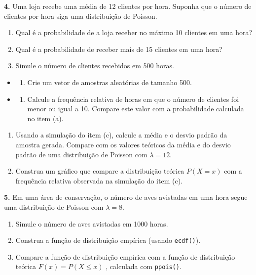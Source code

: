 \documentclass[
]{book}
\providecommand{\tightlist}{%
  \setlength{\itemsep}{0pt}\setlength{\parskip}{0pt}}
\begin{document}
\textbf{4.} Uma loja recebe uma média de 12 clientes por hora. Suponha que o número de clientes por hora siga uma distribuição de Poisson.

\begin{enumerate}
\def\labelenumi{(\alph{enumi})}
\item
  Qual é a probabilidade de a loja receber no máximo 10 clientes em uma hora?
\item
  Qual é a probabilidade de receber mais de 15 clientes em uma hora?
\item
  Simule o número de clientes recebidos em 500 horas.
\end{enumerate}

\begin{itemize}
\tightlist
\item
  \begin{enumerate}
  \def\labelenumi{(\roman{enumi})}
  \tightlist
  \item
    Crie um vetor de amostras aleatórias de tamanho 500.
  \end{enumerate}
\item
  \begin{enumerate}
  \def\labelenumi{(\roman{enumi})}
  \setcounter{enumi}{1}
  \tightlist
  \item
    Calcule a frequência relativa de horas em que o número de clientes foi menor ou igual a 10. Compare este valor com a probabilidade calculada no item (a).
  \end{enumerate}
\end{itemize}

\begin{enumerate}
\def\labelenumi{(\alph{enumi})}
\setcounter{enumi}{3}
\item
  Usando a simulação do item (c), calcule a média e o desvio padrão da amostra gerada. Compare com os valores teóricos da média e do desvio padrão de uma distribuição de Poisson com \(\lambda = 12\).
\item
  Construa um gráfico que compare a distribuição teórica \(P(X = x)\) com a frequência relativa observada na simulação do item (c).
\end{enumerate}

\textbf{5.} Em uma área de conservação, o número de aves avistadas em uma hora segue uma distribuição de Poisson com \(\lambda = 8\).

\begin{enumerate}
\def\labelenumi{(\alph{enumi})}
\item
  Simule o número de aves avistadas em 1000 horas.
\item
  Construa a função de distribuição empírica (usando \texttt{ecdf()}).
\item
  Compare a função de distribuição empírica com a função de distribuição teórica \(F(x) = P(X \leq x)\) , calculada com \texttt{ppois()}.
\end{enumerate}
\end{document}
